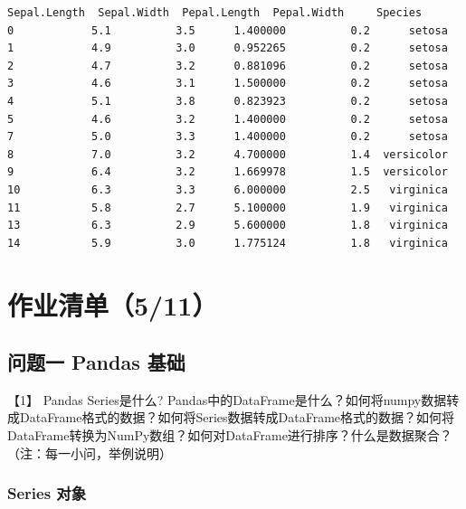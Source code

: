 \documentclass[11pt]{article}
\makeatletter
\newcommand{\boxspacing}{\kern\kvtcb@left@rule\kern\kvtcb@boxsep}
\newcommand{\prompt}[4]{
        \ttfamily\llap{{\color{#2}[#3]:\hspace{3pt}#4}}\vspace{-\baselineskip}
    }
\makeatother
\begin{document}
            \begin{tcolorbox}[breakable, size=fbox, boxrule=.5pt, pad at break*=1mm, opacityfill=0]
\prompt{Out}{outcolor}{400}{\boxspacing}
\begin{Verbatim}[commandchars=\\\{\}]
    Sepal.Length  Sepal.Width  Pepal.Length  Pepal.Width     Species
0            5.1          3.5      1.400000          0.2      setosa
1            4.9          3.0      0.952265          0.2      setosa
2            4.7          3.2      0.881096          0.2      setosa
3            4.6          3.1      1.500000          0.2      setosa
4            5.1          3.8      0.823923          0.2      setosa
5            4.6          3.2      1.400000          0.2      setosa
7            5.0          3.3      1.400000          0.2      setosa
8            7.0          3.2      4.700000          1.4  versicolor
9            6.4          3.2      1.669978          1.5  versicolor
10           6.3          3.3      6.000000          2.5   virginica
11           5.8          2.7      5.100000          1.9   virginica
13           6.3          2.9      5.600000          1.8   virginica
14           5.9          3.0      1.775124          1.8   virginica
\end{Verbatim}
\end{tcolorbox}
        
    \hypertarget{ux4f5cux4e1aux6e05ux5355511}{%
\section{作业清单（5/11）}\label{ux4f5cux4e1aux6e05ux5355511}}

    \hypertarget{ux95eeux9898ux4e00-pandas-ux57faux7840}{%
\subsection{问题一 Pandas
基础}\label{ux95eeux9898ux4e00-pandas-ux57faux7840}}

    【1】 Pandas Series是什么?
Pandas中的DataFrame是什么？如何将numpy数据转成DataFrame格式的数据？如何将Series数据转成DataFrame格式的数据？如何将DataFrame转换为NumPy数组？如何对DataFrame进行排序？什么是数据聚合？（注：每一小问，举例说明）

    \hypertarget{series-ux5bf9ux8c61}{%
\subsubsection{Series 对象}\label{series-ux5bf9ux8c61}}
\end{document}
